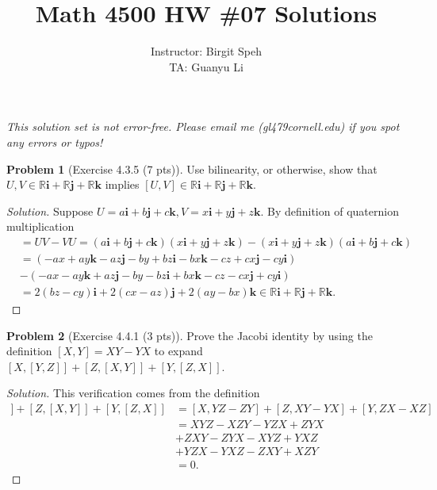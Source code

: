 \documentclass{article}
\title{Math 4500 HW \#07 Solutions}
\author{Instructor: Birgit Speh\\ TA: Guanyu Li}
\date{}
\theoremstyle{definition}
\newtheorem{problem}{Problem}
\theoremstyle{plain}
\begin{document}
\maketitle\par

\emph{This solution set is not error-free. Please email me (gl479\MVAt cornell.edu) if you spot any errors or typos!}

\begin{problem}[Exercise 4.3.5 (7 pts)]Use bilinearity, or otherwise, show that $U,V\in\mathbb{R}\bm{i}+\mathbb{R}\bm{j}+\mathbb{R}\bm{k}$ implies $[U,V]\in\mathbb{R}\bm{i}+\mathbb{R}\bm{j}+\mathbb{R}\bm{k}$.
\end{problem}
\begin{adjustwidth}{0.7cm}{}
\color{blue}
\begin{proof}[Solution]
Suppose $U=a\bm{i}+b\bm{j}+c\bm{k},V=x\bm{i}+y\bm{j}+z\bm{k}$. By definition of quaternion multiplication
\begin{align*}
[U,V]&=UV-VU=(a\bm{i}+b\bm{j}+c\bm{k})(x\bm{i}+y\bm{j}+z\bm{k})-(x\bm{i}+y\bm{j}+z\bm{k})(a\bm{i}+b\bm{j}+c\bm{k})\\
&=(-ax+ay\bm{k}-az\bm{j}-by+bz\bm{i}-bx\bm{k}-cz+cx\bm{j}-cy\bm{i})\\
&-(-ax-ay\bm{k}+az\bm{j}-by-bz\bm{i}+bx\bm{k}-cz-cx\bm{j}+cy\bm{i})\\
&=2(bz-cy)\bm{i}+2(cx-az)\bm{j}+2(ay-bx)\bm{k}\in\mathbb{R}\bm{i}+\mathbb{R}\bm{j}+\mathbb{R}\bm{k}.
\end{align*}
\color{black}
\end{proof}
\end{adjustwidth}

\begin{problem}[Exercise 4.4.1 (3 pts)]Prove the Jacobi identity by using the definition $[X,Y]=XY-YX$ to expand $[X,[Y,Z]]+[Z,[X,Y]]+[Y,[Z,X]]$.
\end{problem}
\begin{adjustwidth}{0.7cm}{}
\color{blue}
\begin{proof}[Solution]
This verification comes from the definition
\begin{align*}
[X,[Y,Z]]+[Z,[X,Y]]+[Y,[Z,X]]&=[X,YZ-ZY]+[Z,XY-YX]+[Y,ZX-XZ]\\
&=XYZ-XZY-YZX+ZYX\\
&+ZXY-ZYX-XYZ+YXZ\\
&+YZX-YXZ-ZXY+XZY\\
&=0.
\end{align*}
\color{black}
\end{proof}
\end{adjustwidth}
\end{document}
